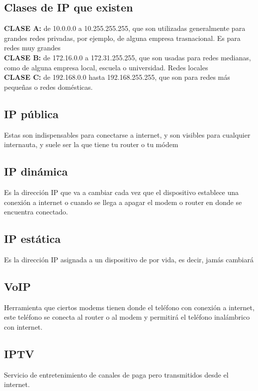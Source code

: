\documentclass[letterpaper,12pt]{article}
\begin{document}
\begin{sloppypar}
\subsection{Clases de IP que existen}
\textbf{CLASE A:} de 10.0.0.0 a 10.255.255.255, que son utilizadas generalmente para grandes redes privadas, por ejemplo, de alguna empresa trasnacional. Es para redes muy grandes
\vspace{0.3cm}\\ 
\textbf{CLASE B:} de 172.16.0.0 a 172.31.255.255, que son usadas para redes medianas, como de alguna empresa local, escuela o universidad. Redes locales
\vspace{0.3cm}\\
\textbf{CLASE C: }de 192.168.0.0 hasta 192.168.255.255, que son para redes más pequeñas o redes domésticas.

\subsection{IP pública}
Estas son indispensables para conectarse a internet, y son visibles para cualquier internauta, y suele ser la que tiene tu router o tu módem 

\subsection{IP dinámica}
Es la dirección IP que va a cambiar cada vez que el dispositivo establece una conexión a internet o cuando se llega a apagar el modem o router en donde se encuentra conectado.

\subsection{IP estática}
Es la dirección IP asignada a un dispositivo de por vida, es decir, jamás cambiará

\subsection{VoIP}
Herramienta que ciertos modems tienen donde el teléfono con conexión a internet, este teléfono se conecta al router o al modem y permitirá el teléfono inalámbrico con internet.

\subsection{IPTV}
Servicio de entretenimiento de canales de paga pero transmitidos desde el internet.


\end{sloppypar}
\end{document}
